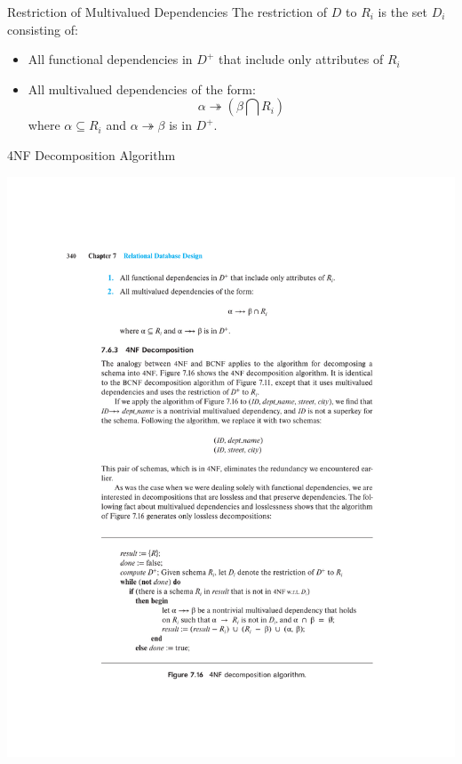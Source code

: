\documentclass{beamer}
\begin{document}
\begin{frame}{Restriction of Multivalued Dependencies}
    The restriction of $D$ to $R_i$ is the set $D_i$ consisting of:
        \begin{itemize}
            \item All functional dependencies in $D^+$ that include only attributes of $R_i$
            \item All multivalued dependencies of the form:
                $$
                    \alpha \twoheadrightarrow (\beta \bigcap R_i)
                $$
                where $\alpha \subseteq R_i$ and $\alpha \twoheadrightarrow \beta$ is in $D^+$.
        \end{itemize}
\end{frame}

\begin{frame}{4NF Decomposition Algorithm}
    \begin{center}
        \includegraphics[width=\textwidth, trim={4.5cm 3.5cm 4cm 16.75cm}, clip]{figures/p340_Decomposition_4NF}
    \end{center}
\end{frame}
\end{document}
